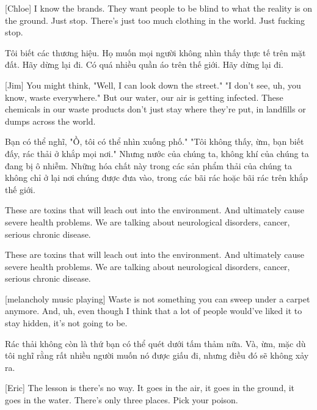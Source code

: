 \documentclass[a4paper]{article}
\begin{document}
	[Chloe] I know the brands. They want people to be blind to what the reality is on the ground.
	Just stop. There's just too much clothing in the world.
	Just fucking stop.
	
	\begin{vietnamese-v2}
		[Chloe] Tôi biết các thương hiệu. Họ muốn mọi người không nhìn thấy thực tế trên mặt đất.
		Hãy dừng lại đi. Có quá nhiều quần áo trên thế giới.
		Hãy dừng lại đi.
	\end{vietnamese-v2}
	
	[Jim] You might think, "Well, I can look down the street."
	"I don't see, uh, you know, waste everywhere."
	But our water, our air is getting infected.
	These chemicals in our waste products don't just stay where they're put, in landfills or dumps across the world.
	
	\begin{vietnamese-v2}
		[Jim] Bạn có thể nghĩ, "Ồ, tôi có thể nhìn xuống phố."
		"Tôi không thấy, ừm, bạn biết đấy, rác thải ở khắp mọi nơi."
		Nhưng nước của chúng ta, không khí của chúng ta đang bị ô nhiễm.
		Những hóa chất này trong các sản phẩm thải của chúng ta không chỉ ở lại nơi chúng được đưa vào, trong các bãi rác hoặc bãi rác trên khắp thế giới.
	\end{vietnamese-v2}
	
	These are toxins that will leach out into the environment.
	And ultimately cause severe health problems. We are talking about neurological disorders, cancer, serious chronic disease.
	
	\begin{vietnamese-v2}
		These are toxins that will leach out into the environment.
		And ultimately cause severe health problems. We are talking about neurological disorders, cancer, serious chronic disease.
	\end{vietnamese-v2}
	
	[melancholy music playing]
	Waste is not something you can sweep under a carpet anymore.
	And, uh, even though I think that a lot of people would've liked it to stay hidden, it's not going to be.
	
	\begin{vietnamese-v2}
		Rác thải không còn là thứ bạn có thể quét dưới tấm thảm nữa.
		Và, ừm, mặc dù tôi nghĩ rằng rất nhiều người muốn nó được giấu đi, nhưng điều đó sẽ không xảy ra.
	\end{vietnamese-v2}
	
	[Eric] The lesson is there's no way.
	It goes in the air, it goes in the ground, it goes in the water.
	There's only three places.
	Pick your poison.
	
\end{document}
